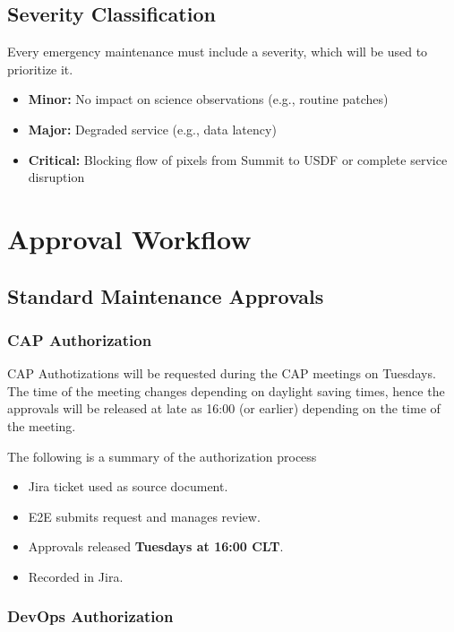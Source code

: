 \subsection{Severity Classification}

Every emergency maintenance must include a severity, which will be used to prioritize it. 

\begin{itemize}[label=--]
  \item \textbf{Minor:} No impact on science observations (e.g., routine patches)
  \item \textbf{Major:} Degraded service (e.g., data latency)
  \item \textbf{Critical:} Blocking flow of pixels from Summit to USDF or complete service disruption
\end{itemize}

\section{Approval Workflow}

\subsection{Standard Maintenance Approvals}

\subsubsection{CAP Authorization}

CAP Authotizations will be requested during the CAP meetings on Tuesdays. The time of the meeting changes depending on daylight saving times, hence the approvals will be released at late as 16:00 (or earlier) depending on the time of the meeting.

The following is a summary of the authorization process

\begin{itemize}[label=--]
  \item Jira ticket used as source document.
  \item E2E submits request and manages review.
  \item Approvals released \textbf{Tuesdays at 16:00 CLT}.
  \item Recorded in Jira.
\end{itemize}

\subsubsection{DevOps Authorization}

